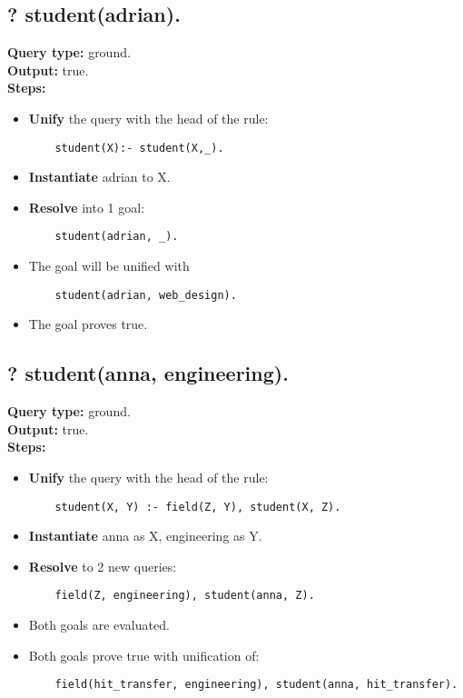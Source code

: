 \subsection{? student(adrian).}
\textbf{Query type: } ground. \\
\textbf{Output:} true. \\
\textbf{Steps:}
\begin{itemize}
    \item \textbf{Unify} the query with the head of the rule:
    \begin{lstlisting}
    student(X):- student(X,_).
    \end{lstlisting}
    \item \textbf{Instantiate} adrian to X.
    \item \textbf{Resolve} into 1 goal:
    \begin{lstlisting}
    student(adrian, _).
    \end{lstlisting}
    \item The goal will be unified with 
    \begin{lstlisting}
    student(adrian, web_design).
    \end{lstlisting}
    \item The goal proves true.
\end{itemize}

\subsection{? student(anna, engineering).}
\textbf{Query type: } ground. \\
\textbf{Output:} true. \\
\textbf{Steps:}
\begin{itemize}
    \item \textbf{Unify} the query with the head of the rule:
    \begin{lstlisting}
    student(X, Y) :- field(Z, Y), student(X, Z).
    \end{lstlisting}
    \item \textbf{Instantiate } anna as X, engineering as Y.
    \item \textbf{Resolve} to 2 new queries:
    \begin{lstlisting}
    field(Z, engineering), student(anna, Z).
    \end{lstlisting}
    \item Both goals are evaluated.
    \item Both goals prove true with unification of:
    \begin{lstlisting}
    field(hit_transfer, engineering), student(anna, hit_transfer).
    \end{lstlisting}
\end{itemize}

